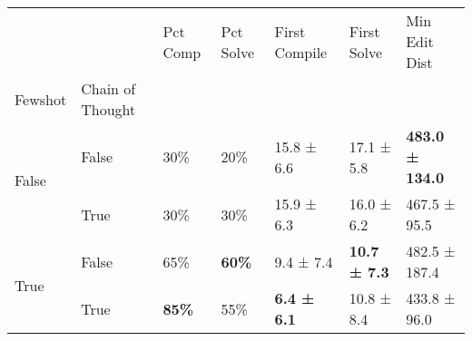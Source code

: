 \begin{tabular}{lllllll}
\toprule
 &  & Pct Comp & Pct Solve & First Compile & First Solve & Min Edit Dist \\
Fewshot & Chain of Thought &  &  &  &  &  \\
\midrule
\multirow[c]{2}{*}{False} & False & 30\% & 20\% & 15.8 ± 6.6 & 17.1 ± 5.8 & \textbf{483.0 ± 134.0} \\
\cline{2-7}
 & True & 30\% & 30\% & 15.9 ± 6.3 & 16.0 ± 6.2 & 467.5 ± 95.5 \\
\cline{1-7} \cline{2-7}
\multirow[c]{2}{*}{True} & False & 65\% & \textbf{60\%} & 9.4 ± 7.4 & \textbf{10.7 ± 7.3} & 482.5 ± 187.4 \\
\cline{2-7}
 & True & \textbf{85\%} & 55\% & \textbf{6.4 ± 6.1} & 10.8 ± 8.4 & 433.8 ± 96.0 \\
\cline{1-7} \cline{2-7}
\bottomrule
\end{tabular}
